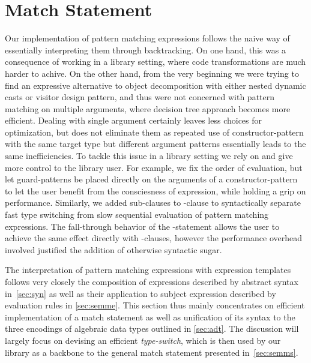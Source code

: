 \section{Match Statement} %
\label{sec:impl}

Our implementation of pattern matching expressions follows the naive way of 
essentially interpreting them through backtracking. On one hand, this was a 
consequence of working in a library setting, where code transformations are much 
harder to achive. On the other hand, from the very beginning we were trying to 
find an expressive alternative to object decomposition with either nested 
dynamic casts or visitor design pattern, and thus were not concerned with 
pattern matching on multiple arguments, where decision tree approach becomes 
more efficient. Dealing with single argument certainly leaves less choices for 
optimization, but does not eliminate them as repeated use of constructor-pattern 
with the same target type but different argument patterns essentially leads to 
the same inefficiencies. To tackle this issue in a library setting we rely on 
and give more control to the library user. For example, we fix the order of 
evaluation, but let guard-patterns be placed directly on the arguments of a 
constructor-pattern to let the user benefit from the consciesness of expression, 
while holding a grip on performance. Similarly, we added  sub-clauses 
to -clause to syntactically separate fast type switching from slow 
sequential evaluation of pattern matching expressions. The fall-through behavior 
of the -statement allows the user to achieve the same effect 
directly with -clauses, however the performance overhead involved 
justified the addition of otherwise syntactic sugar.

The interpretation of pattern matching expressions with expression templates follows 
very closely the composition of expressions described by abstract syntax 
in~\textsection\ref{sec:syn} as well as their application to subject expression 
described by evaluation rules in \textsection\ref{sec:semme}. This section thus
mainly concentrates on efficient implementation of a match statement as 
well as unification of its syntax to the three encodings of algebraic data types
outlined in \textsection\ref{sec:adt}. The discussion will largely focus on 
devising an efficient \emph{type-switch}, which is then used by our library as a 
backbone to the general match statement presented in~\textsection\ref{sec:semms}. 

